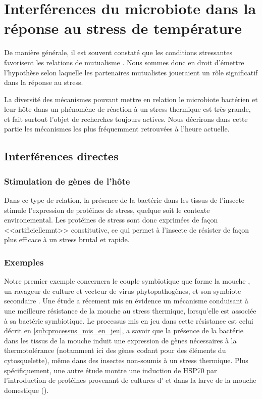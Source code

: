 \chapter{Interférences du microbiote dans la réponse au stress de température} %
	\label{sec:implicationµbiote}

De manière générale, il est souvent constaté que les conditions stressantes favorisent les relations de mutualisme \cite{meadows2013}.
Nous sommes donc en droit d'émettre l'hypothèse selon laquelle les partenaires mutualistes joueraient un rôle significatif dans la réponse au stress.

La diversité des mécanismes pouvant mettre en relation le microbiote bactérien
et leur hôte dans un phénomène de réaction à un stress thermique est très
grande, et fait surtout l'objet de recherches toujours actives. Nous décrirons
dans cette partie les mécanismes les plus fréquemment retrouvées à l'heure
actuelle.


	\section{Interférences directes} %
		\label{sec:direct}

\subsection{Stimulation de gènes de l’hôte} %
\label{sub:genes_hote}

Dans ce type de relation, la présence de la bactérie dans les tissus de
l'insecte stimule l'expression de protéines de stress, quelque soit le
contexte environemental. Les protéines de stress sont donc exprimées de façon
<<artificiellemnt>> constitutive, ce qui permet à l'insecte de résister de façon
plus efficace à un stress brutal et rapide.

\subsection{Exemples} %
\label{sub:exemples}


Notre premier exemple concernera le couple symbiotique que forme la mouche
, un ravageur de culture et vecteur de virus
phytopathogènes, et son symbiote secondaire . Une étude
\cite{brumin2011} a récement mis en évidence un mécanisme conduisant à une
meilleure résistance de la mouche au stress thermique, lorsqu'elle est
associée à sa bactérie symbiotique. Le processus mis en jeu dans cette
résistance est celui décrit en \ref{sub:processus_mis_en_jeu}, a savoir que la
présence de la bactérie dans les tissus de la mouche induit une expression de
gènes nécessaires à la thermotolérance (notamment ici des gènes codant pour
des éléments du cytosquelette), même dans des insectes non-soumis à un stress
thermique.
Plus spécifiquement, une autre étude \cite{tang2012} montre une induction de HSP70 par l'introduction de protéines provenant de cultures d' et  dans la larve de la mouche domestique ().

